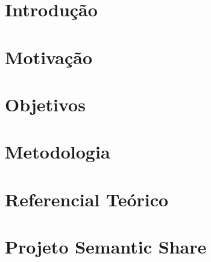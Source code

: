 \documentclass[a4paper]{abnt}
\begin{document}


\pagestyle{plain}
\tableofcontents
\listoffigures
\listoftables















\setcounter{page}{1}

\chapter{Introdução}
\label{cha:introducao}
    

\chapter{Motivação}
\label{cha:motivacao}
	

\chapter{Objetivos}
\label{cha:objetivos}
	

\chapter{Metodologia}
\label{cha:metodologia}
	

\chapter{Referencial Teórico}
\label{cha:referencial_teorico}
	

\chapter{Projeto Semantic Share}
\label{cha:proj_semantic}
	
\end{document}
